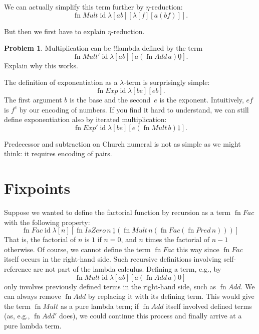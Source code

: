 \documentclass[10pt,a4paper]{article}
\theoremstyle{plain}
\theoremstyle{definition}
\newtheorem{prob}{Problem}[section]
\theoremstyle{remark}
\newenvironment{editorial}{}{}
\newcommand*{\olfileid}[3]{}
\newcommand*{\olsection}[1]{\section*{#1}}
\providecommand{\num}[1]{\underline{#1}}
\providecommand{\lambd}{\ensuremath{\lambda}}
\providecommand{\ident}{\operatorname{id}}
\providecommand{\fn}{\operatorname{fn}}
\begin{document}
\begin{editorial}
We can actually simplify this term further by $\eta$-reduction:
\[
  \fn{Mult} \ident \lambd[ab][\lambd[f][a (b f)]].
\]

But then we first have to explain $\eta$-reduction.
\end{editorial}

\begin{prob}
Multiplication can be !!{lambda define}d by the term
\[
  \fn{Mult}' \ident \lambd[ab][a (\fn{Add}\, a) \num{0}].
\]
Explain why this works.
\end{prob}

The definition of exponentiation as a $\lambd$-term is
surprisingly simple:
\[
  \fn{Exp} \ident \lambd[be][e b].
\]
The first argument $b$ is the base and the second~$e$ is the exponent.
Intuitively, $e f$ is $f^e$ by our encoding of numbers. If you find it
hard to understand, we can still define exponentiation also by
iterated multiplication:
\[
  \fn{Exp}' \ident \lambd[be][e (\fn{Mult}\, b) \num{1}].
\]

Predecessor and subtraction on Church numeral is not as simple as we
might think: it requires encoding of pairs.





\olfileid{lam}{ldf}{fp}

\olsection{Fixpoints}

Suppose we wanted to define the factorial function by recursion as a
term $\fn{Fac}$ with the following property:
\[
\fn{Fac} \ident \lambd[n][\fn{IsZero}\, n\, \num 1 (\fn{Mult}\, n (\fn{Fac}(\fn{Pred} \, n)))]
\]
That is, the factorial of $n$ is $1$ if $n = 0$, and $n$ times the
factorial of $n-1$ otherwise.  Of course, we cannot define the term
$\fn{Fac}$ this way since $\fn{Fac}$ itself occurs in the right-hand
side. Such recursive definitions involving self-reference
are not part of the lambda calculus. Defining a term, e.g., by
\[
\fn{Mult} \ident \lambd[ab][a (\fn{Add}\, a) 0]
\]
only involves previously defined terms in the right-hand side, such as
$\fn{Add}$. We can always remove $\fn{Add}$ by replacing it with its
defining term.  This would give the term $\fn{Mult}$ as a pure lambda
term; if $\fn{Add}$ itself involved defined terms (as, e.g.,
$\fn{Add}'$ does), we could continue this process and finally arrive at
a pure lambda term.
\end{document}
